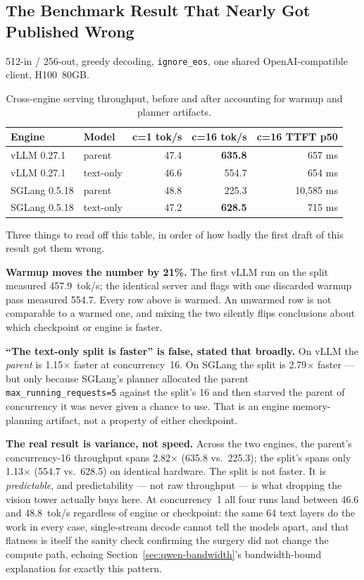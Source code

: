 \documentclass[11pt]{article}
\begin{document}
\subsection{The Benchmark Result That Nearly Got Published Wrong}

512-in / 256-out, greedy decoding, \texttt{ignore\_eos}, one shared OpenAI-compatible
client, H100~80GB.

\begin{table}[h]
\centering
\small
\begin{tabular}{llrrr}
\toprule
Engine & Model & c=1 tok/s & c=16 tok/s & c=16 TTFT p50 \\
\midrule
vLLM 0.27.1 & parent & 47.4 & \textbf{635.8} & 657 ms \\
vLLM 0.27.1 & text-only & 46.6 & 554.7 & 654 ms \\
SGLang 0.5.18 & parent & 48.8 & 225.3 & 10{,}585 ms \\
SGLang 0.5.18 & text-only & 47.2 & \textbf{628.5} & 715 ms \\
\bottomrule
\end{tabular}
\caption{Cross-engine serving throughput, before and after accounting for warmup and planner artifacts.}
\end{table}

Three things to read off this table, in order of how badly the first draft of this
result got them wrong.

\textbf{Warmup moves the number by 21\%.} The first vLLM run on the split measured
457.9~tok/s; the identical server and flags with one discarded warmup pass measured
554.7. Every row above is warmed. An unwarmed row is not comparable to a warmed one, and
mixing the two silently flips conclusions about which checkpoint or engine is faster.

\textbf{``The text-only split is faster'' is false, stated that broadly.} On vLLM the
\emph{parent} is 1.15$\times$ faster at concurrency~16. On SGLang the split is
2.79$\times$ faster --- but only because SGLang's planner allocated the parent
\texttt{max\_running\_requests=5} against the split's 16 and then starved the parent of
concurrency it was never given a chance to use. That is an engine memory-planning
artifact, not a property of either checkpoint.

\textbf{The real result is variance, not speed.} Across the two engines, the parent's
concurrency-16 throughput spans 2.82$\times$ (635.8 vs.\ 225.3); the split's spans only
1.13$\times$ (554.7 vs.\ 628.5) on identical hardware. The split is not faster. It is
\emph{predictable}, and predictability --- not raw throughput --- is what dropping the
vision tower actually buys here. At concurrency~1 all four runs land between 46.6 and
48.8~tok/s regardless of engine or checkpoint: the same 64 text layers do the work in
every case, single-stream decode cannot tell the models apart, and that flatness is
itself the sanity check confirming the surgery did not change the compute path, echoing
Section~\ref{sec:qwen-bandwidth}'s bandwidth-bound explanation for exactly this
pattern.
\end{document}
